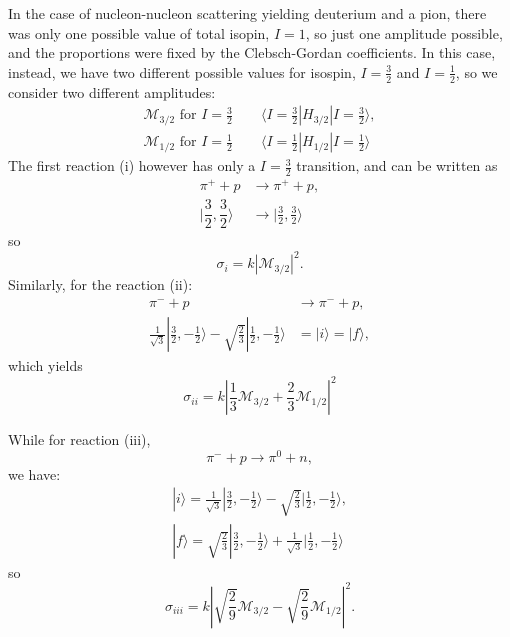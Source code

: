 In the case of nucleon-nucleon scattering yielding deuterium and a pion, there was only one possible value of total isopin, \(I=1\), so just one amplitude possible, and the proportions were fixed by the Clebsch-Gordan coefficients. In this case, instead, we have two different possible values for isospin, $I=\frac{3}{2}$ and $I=\frac{1}{2}$, so we consider two different amplitudes:
\begin{align*}
    \mathcal{M}_{3/2} \text{ for } I=\frac{3}{2} \qquad \langle I=\frac{3}{2}|H_{3/2}|I=\frac{3}{2}\rangle,\\
    \mathcal{M}_{1/2} \text{ for } I=\frac{1}{2} \qquad \langle I=\frac{1}{2}|H_{1/2}|I=\frac{1}{2}\rangle
\end{align*}
The first reaction (i) however has only a $I=\frac{3}{2}$ transition, and can be written as
\begin{align*}
    \pi^+ +p &\rightarrow \pi^+ +p,\\
    |\dfrac{3}{2} ,\dfrac{3}{2}\rangle &\rightarrow   |\frac{3}{2} ,\frac{3}{2}\rangle
\end{align*}
so
\[
\sigma_i =k|\mathcal{M}_{3/2}|^2.
\]
Similarly, for the reaction (ii):
\begin{align*}
    \pi^- +p &\rightarrow  \pi^- +p,\\
    \frac{1}{\sqrt{3}}|\frac{3}{2} ,-\frac{1}{2}\rangle-\sqrt{\frac{2}{3}}|\frac{1}{2}, -\frac{1}{2}\rangle&=|i\rangle=|f\rangle,
\end{align*}
which yields 
\[\sigma_{ii} =k|\frac{1}{3}\mathcal{M}_{3/2}+\frac{2}{3}\mathcal{M}_{1/2}|^2\]

While for reaction (iii),
\[\pi^- +p \rightarrow  \pi^0 +n,\]
we have:
\begin{align*}
    |i\rangle=\frac{1}{\sqrt{3}}|\frac{3}{2} ,-\frac{1}{2}\rangle-\sqrt{\frac{2}{3}}|\frac{1}{2}, -\frac{1}{2}\rangle,\\
    |f\rangle=\sqrt{\frac{2}{3}}|\frac{3}{2} ,-\frac{1}{2}\rangle+\frac{1}{\sqrt{3}}|\frac{1}{2}, -\frac{1}{2}\rangle
\end{align*}
so\[\sigma_{iii}=k|\sqrt{\frac{2}{9}}\mathcal{M}_{3/2}-\sqrt{\frac{2}{9}}\mathcal{M}_{1/2}|^2.\]

